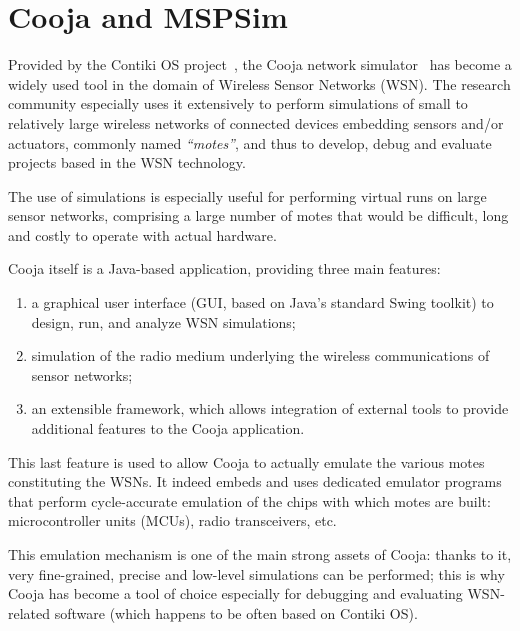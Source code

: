 \documentclass[10pt]{ewsn-proc}
\begin{document}

\section{Cooja and MSPSim}
\label{coojaMspsim}

Provided by the Contiki OS project~\cite{ContikiOS}, the Cooja network
simulator~\cite{Cooja} has become a widely used tool in the domain of
Wireless Sensor Networks (WSN). The research community especially uses
it extensively to perform simulations of small to relatively large wireless
networks of connected devices embedding sensors and/or actuators, commonly
named \emph{``motes''}, and thus to develop, debug and evaluate projects
based in the WSN technology.

The use of simulations is especially useful for performing virtual runs
on large sensor networks, comprising a large number of motes that would
be difficult, long and costly to operate with actual hardware.

\medskip

Cooja itself is a Java-based application, providing three main features:
\begin{enumerate}
\item a graphical user interface (GUI, based on Java's standard Swing toolkit)
to design, run, and analyze WSN simulations;
\item simulation of the radio medium underlying the wireless communications
of sensor networks;
\item an extensible framework, which allows integration of external tools
to provide additional features to the Cooja application.
\end{enumerate}

\medskip

This last feature is used to allow Cooja to actually emulate the various
motes constituting the WSNs. It indeed embeds and uses dedicated emulator
programs that perform cycle-accurate emulation of the chips with which motes
are built: microcontroller units (MCUs), radio transceivers, etc.

This emulation mechanism is one of the main strong assets of Cooja:
thanks to it, very fine-grained, precise and low-level simulations
can be performed; this is why Cooja has become a tool of choice especially
for debugging and evaluating WSN-related software (which happens to be
often based on Contiki OS).
\end{document}

